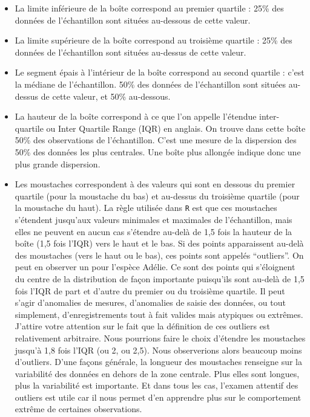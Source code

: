 \documentclass[
  letterpaper,
  DIV=11,
  numbers=noendperiod]{scrreprt}
\providecommand{\tightlist}{%
  \setlength{\itemsep}{0pt}\setlength{\parskip}{0pt}}\usepackage{longtable,booktabs,array}
\begin{document}
\begin{itemize}
\tightlist
\item
  La limite inférieure de la boîte correspond au premier quartile : 25\%
  des données de l'échantillon sont situées au-dessous de cette valeur.
\item
  La limite supérieure de la boîte correspond au troisième quartile :
  25\% des données de l'échantillon sont situées au-dessus de cette
  valeur.
\item
  Le segment épais à l'intérieur de la boîte correspond au second
  quartile : c'est la médiane de l'échantillon. 50\% des données de
  l'échantillon sont situées au-dessus de cette valeur, et 50\%
  au-dessous.
\item
  La hauteur de la boîte correspond à ce que l'on appelle l'étendue
  inter-quartile ou Inter Quartile Range (IQR) en anglais. On trouve
  dans cette boîte 50\% des observations de l'échantillon. C'est une
  mesure de la dispersion des 50\% des données les plus centrales. Une
  boîte plus allongée indique donc une plus grande dispersion.
\item
  Les moustaches correspondent à des valeurs qui sont en dessous du
  premier quartile (pour la moustache du bas) et au-dessus du troisième
  quartile (pour la moustache du haut). La règle utilisée dans
  \texttt{R} est que ces moustaches s'étendent jusqu'aux valeurs
  minimales et maximales de l'échantillon, mais elles ne peuvent en
  aucun cas s'étendre au-delà de 1,5 fois la hauteur de la boîte (1,5
  fois l'IQR) vers le haut et le bas. Si des points apparaissent au-delà
  des moustaches (vers le haut ou le bas), ces points sont appelés
  ``outliers''. On peut en observer un pour l'espèce Adélie. Ce sont des
  points qui s'éloignent du centre de la distribution de façon
  importante puisqu'ils sont au-delà de 1,5 fois l'IQR de part et
  d'autre du premier ou du troisième quartile. Il peut s'agir
  d'anomalies de mesures, d'anomalies de saisie des données, ou tout
  simplement, d'enregistrements tout à fait valides mais atypiques ou
  extrêmes. J'attire votre attention sur le fait que la définition de
  ces outliers est relativement arbitraire. Nous pourrions faire le
  choix d'étendre les moustaches jusqu'à 1,8 fois l'IQR (ou 2, ou 2,5).
  Nous observerions alors beaucoup moins d'outliers. D'une façons
  générale, la longueur des moustaches renseigne sur la variabilité des
  données en dehors de la zone centrale. Plus elles sont longues, plus
  la variabilité est importante. Et dans tous les cas, l'examen attentif
  des outliers est utile car il nous permet d'en apprendre plus sur le
  comportement extrême de certaines observations.
\end{itemize}
\end{document}
